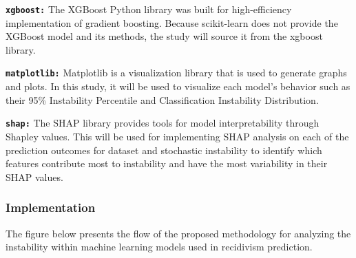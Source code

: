 \documentclass[12pt]{article}
\begin{document}
\textbf{\texttt{xgboost:}} The XGBoost Python library was built for high-efficiency implementation of gradient boosting. Because scikit-learn does not provide the XGBoost model and its methods, the study will source it from the xgboost library.

\textbf{\texttt{matplotlib:}} Matplotlib is a visualization library that is used to generate graphs and plots. In this study, it will be used to visualize each model's behavior such as their 95\% Instability Percentile and Classification Instability Distribution. 

\textbf{\texttt{shap:}} The SHAP library provides tools for model interpretability through Shapley values. This will be used for implementing SHAP analysis on each of the prediction outcomes for dataset and stochastic instability to identify which features contribute most to instability and have the most variability in their SHAP values.

\subsubsection{Implementation}
The figure below presents the flow of the proposed methodology for analyzing the instability within machine learning models used in recidivism prediction. 
\end{document}
